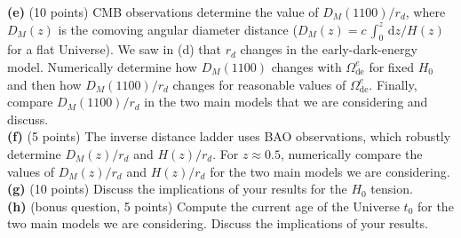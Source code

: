 \documentclass[12pt]{article}
\begin{document}
{\bf (e)} (10 points) CMB observations determine the value of $D_M(1100)/r_d$, where $D_M(z)$ is the 
comoving angular diameter distance ($D_M(z) = c\,\int^z_0\,\mathrm{d}z/H(z)$ for a flat 
Universe). We saw in (d) that $r_d$ changes in the early-dark-energy model. Numerically 
determine how $D_M(1100)$ changes with $\Omega^e_\mathrm{de}$ for fixed $H_0$ and then 
how $D_M(1100)/r_d$ changes for reasonable values of $\Omega^e_\mathrm{de}$. Finally, 
compare $D_M(1100)/r_d$ in the two main models that we are considering and discuss.\\

{\bf (f)} (5 points) The inverse distance ladder uses BAO observations, which robustly determine 
$D_M(z)/r_d$ and $H(z)/r_d$. For $z \approx 0.5$, numerically compare the values of 
$D_M(z)/r_d$ and $H(z)/r_d$ for the two main models we are considering.\\ 

{\bf (g)} (10 points) Discuss the implications of your results for the $H_0$ tension.\\

{\bf (h)} (bonus question, 5 points) Compute the current age of the Universe $t_0$ for the two main
models we are considering. Discuss the implications of your results.\\ 
\end{document}
